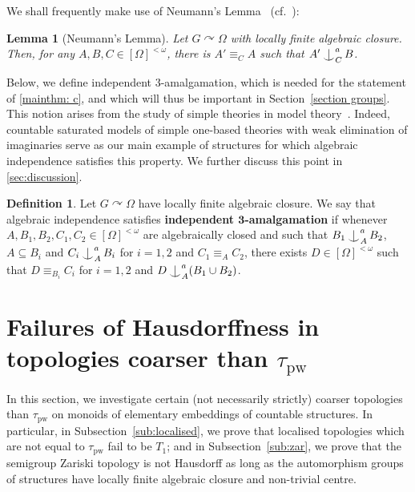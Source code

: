 \documentclass{article}
\newtheorem{lemma}[theorem]{Lemma}
\theoremstyle{remark}
\theoremstyle{definition}
\newtheorem{definition}[theorem]{Definition}
\def\acts{\curvearrowright}
\newcommand{\pw}[0]{\tau_{\mathrm{pw}}}
\def\Ind#1#2{#1\setbox0=\hbox{$#1x$}\kern\wd0\hbox to 0pt{\hss$#1\mid$\hss}
	\lower.9\ht0\hbox to 0pt{\hss$#1\smile$\hss}\kern\wd0}
\def\ind{\mathop{\mathpalette\Ind{}}}
\newcommand{\fps}[1]{[#1]^{<\omega}}
\newcommand{\orq}[0]{\equiv}
\begin{document}
{{{{  {We shall frequently make use of Neumann's Lemma~\cite[Fact 3.1.5]{d2023axiomatic} (cf.~\cite{neumann1976structure}):
   \begin{lemma}[Neumann's Lemma] {Let $G\acts\Omega$ with locally finite algebraic closure. Then, for any $A, B, C\in\fps{\Omega}$, there is $A'\equiv_C A$ such that $A'\ind^{a}_C B$.}
   \end{lemma}

    Below, we define independent $3$-amalgamation, which is needed for the statement of \cref{mainthm: c}, and which will thus be important in Section~\ref{section groups}. This notion arises from the study of simple theories in model theory~\cite{kim1997simple, kim2013simplicity}. Indeed, countable saturated models of simple one-based theories with weak elimination of imaginaries serve as our main example of structures for which algebraic independence satisfies this property. We further discuss this point in 
    \cref{sec:discussion}. 

    \begin{definition} Let $G\acts\Omega$ have locally finite algebraic closure. We say that algebraic %
    {independence} 
    satisfies \textbf{independent $\bm{3}$-amalgamation} if whenever $A,B_{1},B_{2},C_{1},C_{2}\in[\Omega]^{<\omega}$ are algebraically closed and such that $B_{1}\ind^{a}_{A}B_{2}$, $A\subseteq B_{i}$ and $C_{i}\ind^{a}_{A}B_{i}$ for $i=1,2$ and $C_{1}\orq_{A}C_{2}$,  there exists $D\in[\Omega]^{<\omega}$ such that
    $D\orq_{B_{i}} C_{i}$ for $i=1,2$ and $D\ind^{a}_{A}(B_{1}\cup B_{2})$.
    \end{definition}


   





\section{Failures of Hausdorffness in topologies coarser than \texorpdfstring{$\pw$}{the topology of pointwise convergence}}
In this section, we investigate certain (not necessarily strictly) coarser topologies than $\pw$ on monoids of elementary embeddings of countable structures. In particular, in Subsection~\ref{sub:localised}, we prove that localised topologies which are not equal to $\pw$ fail to be $T_1$; and in Subsection~\ref{sub:zar}, we prove that the semigroup Zariski topology is not Hausdorff as long as the automorphism groups of structures have locally finite algebraic closure and non-trivial centre.

}}}}}
\end{document}
